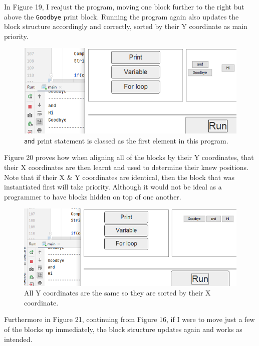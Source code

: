 \documentclass[a4paper, 12pt]{article}
\begin{document}
            In Figure 19, I reajust the program, moving one block further to the right but above the
            \texttt{Goodbye} print block. Running the program again also updates the block structure
            accordingly and correctly, sorted by their Y coordinate as main priority.

            \begin{figure}[h]
                \centering
                \includegraphics[width=120mm]{blockstructure2.png}
                \caption{\texttt{and} print statement is classed as the first element
                in this program.}
            \end{figure}

            Figure 20 proves how when aligning all of the blocks by their Y coordinates, that their X
            coordinates are then learnt and used to determine their knew positions. Note that if their
            X \& Y coordinates are identical, then the block that was instantiated first will take priority.
            Although it would not be ideal as a programmer to have blocks hidden on top of one another.

            \clearpage
            \begin{figure}[h]
                \centering
                \includegraphics[width=120mm]{blockstructure3.png}
                \caption{All Y coordinates are the same so they are sorted by their X coordinate.}
            \end{figure}

            Furthermore in Figure 21, continuing from Figure 16, if I were to move just a few of the
            blocks up immediately, the block structure updates again and works as intended.
\end{document}
